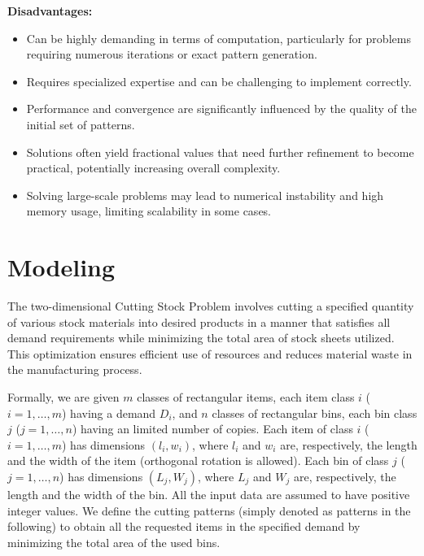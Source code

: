 \documentclass[a4paper]{article}
\begin{document}
\noindent\textbf{Disadvantages:}
\begin{itemize}
    \item Can be highly demanding in terms of computation, particularly for problems requiring numerous iterations or exact pattern generation.
    \item Requires specialized expertise and can be challenging to implement correctly.
    \item Performance and convergence are significantly influenced by the quality of the initial set of patterns.
    \item Solutions often yield fractional values that need further refinement to become practical, potentially increasing overall complexity.
    \item Solving large-scale problems may lead to numerical instability and high memory usage, limiting scalability in some cases.
\end{itemize}



\section{Modeling}
The two-dimensional Cutting Stock Problem involves cutting a specified quantity of various stock materials into desired products in a manner that satisfies all demand requirements while minimizing the total area of stock sheets utilized. This optimization ensures efficient use of resources and reduces material waste in the manufacturing process.

\vspace{0.4cm}

\noindent Formally, we are given \( m \) classes of rectangular items, each item class \( i \) (\( i = 1, \dots, m \)) having a demand \( D_i \), and \( n \) classes of rectangular bins, each bin class \( j \) (\( j = 1, \dots, n \)) having an limited number of copies. Each item of class \( i \) (\( i = 1, \dots, m \)) has dimensions \( (l_i, w_i) \), where \( l_i \) and \( w_i \) are, respectively, the length and the width of the item (orthogonal rotation is allowed). Each bin of class \( j \) (\( j = 1, \dots, n \)) has dimensions \( (L_j, W_j) \), where \( L_j \) and \( W_j \) are, respectively, the length and the width of the bin. All the input data are assumed to have positive integer values. We define the cutting patterns (simply denoted as patterns in the following) to obtain all the requested items in the specified demand by minimizing the total area of the used bins.
\end{document}
